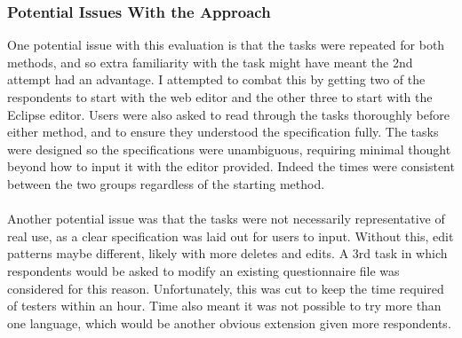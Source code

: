\documentclass{article}
\begin{document}
{%

% 




\subsubsection{Potential Issues With the Approach}
One potential issue with this evaluation is that the tasks were repeated for both methods, and so extra familiarity with the task might have meant the 2nd attempt had an advantage. I attempted to combat this by getting two of the respondents to start with the web editor and the other three to start with the Eclipse editor. Users were also asked to read through the tasks thoroughly before either method, and to ensure they understood the specification fully. The tasks were designed so the specifications were unambiguous, requiring minimal thought beyond how to input it with the editor provided. Indeed the times were consistent between the two groups regardless of the starting method.
\\
\\
Another potential issue was that the tasks were not necessarily representative of real use, as a clear specification was laid out for users to input. Without this, edit patterns maybe different, likely with more deletes and edits. A 3rd task in which respondents would be asked to modify an existing questionnaire file was considered for this reason. Unfortunately, this was cut to keep the time required of testers within an hour. Time also meant it was not possible to try more than one language, which would be another obvious extension given more respondents.
}
\end{document}
